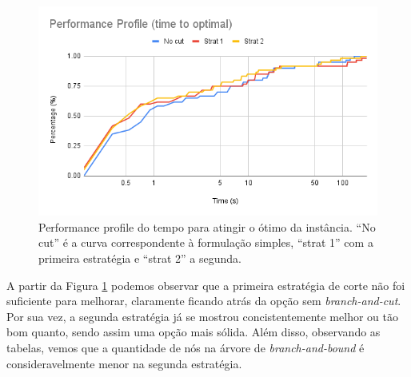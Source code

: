 \documentclass[11pt]{article}
\begin{document}
\begin{figure}[htbp]
\centering
\includegraphics[width=.9\linewidth]{./pp.png}
\caption{\label{fig:perf_profile}Performance profile do tempo para atingir o ótimo da instância. ``No cut'' é a curva correspondente à formulação simples, ``strat 1'' com a primeira estratégia e ``strat 2'' a segunda.}
\end{figure}

A partir da Figura \ref{fig:perf_profile} podemos observar que a primeira estratégia de corte não foi suficiente para melhorar, claramente ficando atrás da opção sem \emph{branch-and-cut}. Por sua vez, a segunda estratégia já se mostrou concistentemente melhor ou tão bom quanto, sendo assim uma opção mais sólida. Além disso, observando as tabelas, vemos que a quantidade de nós na árvore de \emph{branch-and-bound} é consideravelmente menor na segunda estratégia.

\printbibliography
\end{document}
